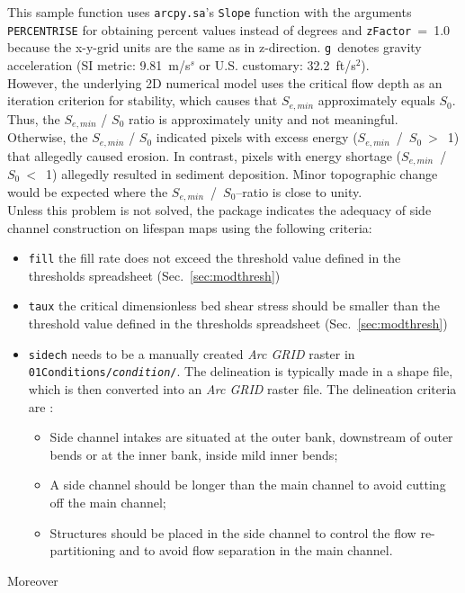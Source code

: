 This sample function uses \texttt{arcpy.sa}'s \texttt{Slope} function with the arguments \texttt{PERCENT{\myUnderscore}RISE} for obtaining percent values instead of degrees and \texttt{zFactor}~=~1.0 because the x-y-grid units are the same as in z-direction. \texttt{g}~denotes gravity acceleration (SI metric: 9.81~m/s$^s$ or U.S. customary: 32.2~ft/s$^2$).\\
However, the underlying 2D numerical model uses the critical flow depth as an iteration criterion for stability, which causes that $S_{e,min}$ approximately equals $S_{0}$. Thus, the $S_{e,min}$ / $S_{0}$ ratio is approximately unity and not meaningful. Otherwise, the  $S_{e,min}$ / $S_{0}$ indicated pixels with excess energy ($S_{e,min}$~/~$S_0~>$~1) that allegedly caused erosion. In contrast, pixels with energy shortage ($S_{e,min}$~/~$S_0~<$~1) allegedly resulted in sediment deposition. Minor topographic change would be expected where the $S_{e,min}$~/~$S_0$--ratio is close to unity.\\%
Unless this problem is not solved, the package indicates the adequacy of side channel construction on lifespan maps using the following criteria:
\begin{itemize}
	\item \texttt{fill} the fill rate does not exceed the threshold value defined in the thresholds spreadsheet (Sec.~\ref{sec:modthresh})
	\item \texttt{taux} the critical dimensionless bed shear stress should be smaller than the threshold value defined in the thresholds spreadsheet (Sec.~\ref{sec:modthresh})
	\item \texttt{sidech} needs to be a manually created \textit{Arc GRID} raster in \texttt{01{\myUnderscore}Conditions/\textit{condition}/}. The delineation is typically made in a shape file, which is then converted into an \textit{Arc GRID} raster file. The delineation criteria are \citep{vandenderen17}:
	\begin{itemize}
		\item Side channel intakes are situated at the outer bank, downstream of outer bends or at the inner bank, inside mild inner bends;
		\item A side channel should be longer than the main channel to avoid cutting off the main channel;
		\item Structures should be placed in the side channel to control the flow re-partitioning and to avoid flow separation in the main channel.
	\end{itemize}
\end{itemize}
Moreover


